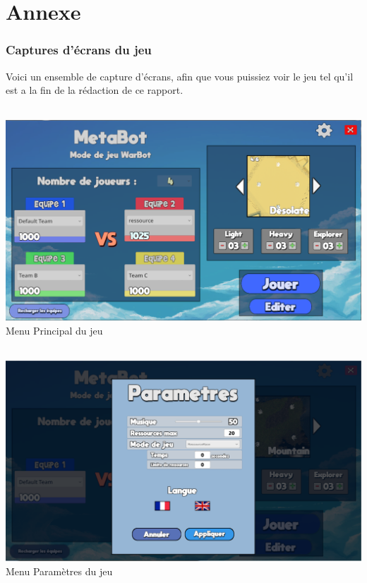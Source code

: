 \documentclass{report}
\begin{document}
\newpage
\part{Annexe}
\section{Captures d'écrans du jeu}
Voici un ensemble de capture d’écrans, afin que vous puissiez voir le jeu tel qu’il est a la fin de la rédaction de ce rapport.

\paragraph{}
\begin{adjustwidth}{-3em}{-3em}
\begin{center}
\includegraphics[scale=0.5]{DATA/menuprincipal.png}
 {Menu Principal du jeu}
\end{center}
\end{adjustwidth}
\paragraph{}


\paragraph{}
\begin{adjustwidth}{-3em}{-3em}
\begin{center}
\includegraphics[scale=0.5]{DATA/menuparametre.png}
 {Menu Paramètres du jeu}
\end{center}
\end{adjustwidth}
\end{document}
